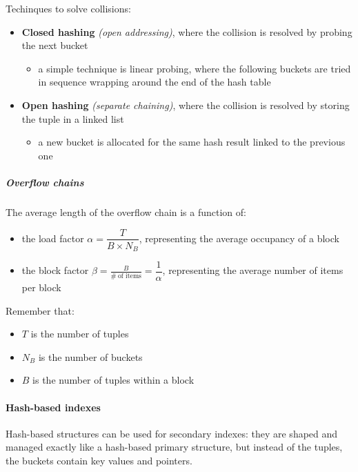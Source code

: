 \documentclass[english]{article}
\begin{document}
Techinques to solve collisions:

\begin{itemize}
  \item \textbf{Closed hashing} \textit{(open addressing)}, where the collision is resolved by probing the next bucket
        \begin{itemize}[label=\(\rightarrow\)]
          \item a simple technique is linear probing, where the following buckets are tried in sequence wrapping around the end of the hash table
        \end{itemize}
  \item \textbf{Open hashing} \textit{(separate chaining)}, where the collision is resolved by storing the tuple in a linked list
        \begin{itemize}[label=\(\rightarrow\)]
          \item a new bucket is allocated for the same hash result linked to the previous one
        \end{itemize}
\end{itemize}

\subparagraph*{Overflow chains}
The average length of the overflow chain is a function of:

\begin{itemize}
  \item the load factor \(\alpha = \dfrac{T}{B \times N_B}\), representing the average occupancy of a block
  \item the block factor \(\beta = \frac{B}{\# \ \text{of items}} = \dfrac{1}{\alpha}\), representing the average number of items per block
\end{itemize}

Remember that:

\begin{itemize}
  \item \(T\) is the number of tuples
  \item \(N_B\) is the number of buckets
  \item \(B\) is the number of tuples within a block
\end{itemize}

\paragraph{Hash-based indexes}

Hash-based structures can be used for secondary indexes:
they are shaped and managed exactly like a hash-based primary structure, but instead of the tuples, the buckets contain key values and pointers.
\end{document}

